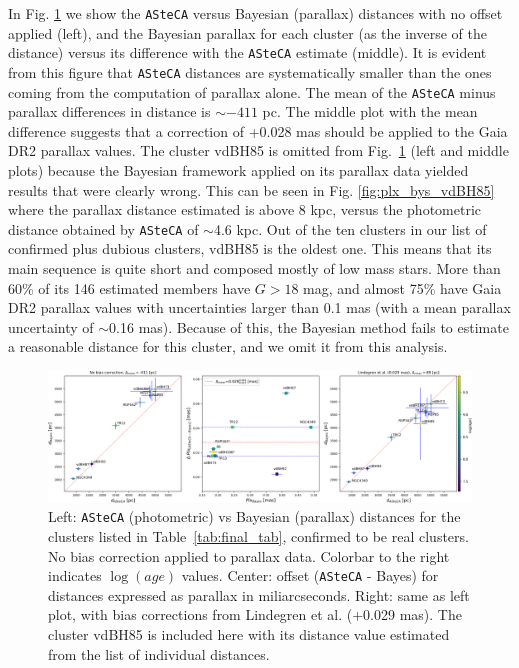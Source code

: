 \documentclass[draft]{aa}
\begin{document}
In Fig. \ref{fig:prlxbias} we show the \texttt{ASteCA} versus Bayesian 
(parallax) distances with no offset applied (left), and the Bayesian
parallax for each cluster (as the inverse of the distance) versus its
difference with the \texttt{ASteCA} estimate (middle).
%
It is evident from this figure that \texttt{ASteCA} distances are
systematically smaller than the ones coming from the computation of parallax
alone. The mean of the \texttt{ASteCA} minus parallax differences in
distance is $\sim-411$ pc.
The middle plot with the mean difference suggests that a correction of
+0.028 mas should be applied to the Gaia DR2 parallax values.
%
The cluster vdBH85 is omitted from Fig.~\ref{fig:prlxbias} (left and
middle plots) because the Bayesian framework applied on its parallax data
yielded results that were clearly wrong. This can be seen in Fig. 
\ref{fig:plx_bys_vdBH85} where the parallax distance estimated is above 8 kpc,
versus the photometric distance obtained by \texttt{ASteCA} of $\sim$4.6 kpc.
Out of the ten clusters in our list of confirmed plus dubious clusters, vdBH85
is the oldest one. This means that its main sequence is quite short and
composed mostly of low mass stars.
More than 60\% of its 146 estimated members have $G>18$ mag, and almost
75\% have Gaia DR2 parallax values with uncertainties larger than 0.1 mas 
(with a mean parallax uncertainty of $\sim$0.16 mas). Because of this, the
Bayesian method fails to estimate a reasonable distance for this cluster,
and we omit it from this analysis.\\

\begin{figure}[ht]
    \centering
    \includegraphics[width=\hsize]{../figs/dist_comparision.png}
\caption{Left: \texttt{ASteCA} (photometric) vs Bayesian (parallax)
distances for the clusters listed in Table~\ref{tab:final_tab}, 
confirmed to be real clusters. No bias correction applied to parallax
data. Colorbar to the right indicates $\log(age)$ values.
Center: offset (\texttt{ASteCA} - Bayes) for distances expressed as
parallax in miliarcseconds.
Right: same as left plot, with bias corrections from Lindegren et al.
(+0.029 mas).
The cluster vdBH85 is included here with its distance value estimated from the
list of \cite{BailerJones_2018} individual distances.
}
    \label{fig:prlxbias}
\end{figure}
\end{document}
